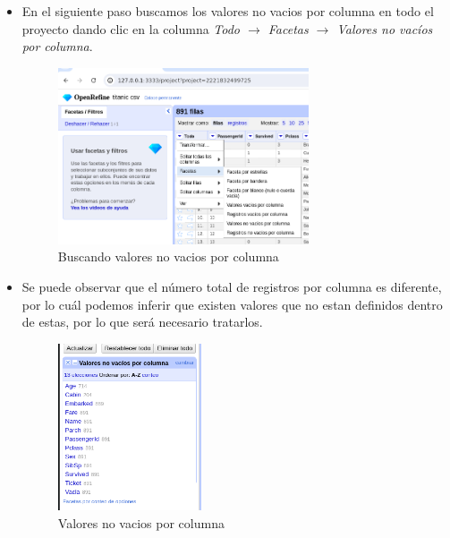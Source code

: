 \documentclass[12pt]{article}
\begin{document}
\begin{itemize}
                    \newpage
                    \item En el siguiente paso buscamos los valores no vacios por columna en todo el proyecto dando clic en la columna \textit{Todo $\rightarrow$ Facetas $\rightarrow$ Valores no vacíos por columna}.
                        \begin{figure}[!h]
                            \centering
                            \includegraphics[width=0.7\textwidth]{img/openrefine-9.png}
                            \caption{Buscando valores no vacios por columna}
                        \end{figure}
                    
                    \item Se puede observar que el número total de registros por columna es diferente, por lo cuál podemos inferir que existen valores que no estan definidos dentro de estas, por lo que será necesario tratarlos.
                        \begin{figure}[!h]
                            \centering
                            \includegraphics[width=0.4\textwidth]{img/openrefine-10.png}
                            \caption{Valores no vacios por columna}
                        \end{figure}
                    

\end{itemize}
\end{document}
